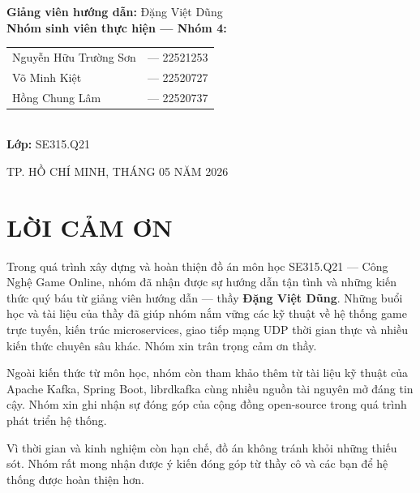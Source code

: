 \documentclass[12pt,a4paper]{report}
\begin{document}
\begin{titlepage}
\begin{flushleft}
\hspace{2cm}
\begin{minipage}{13cm}
{\fontsize{13}{15.6}\selectfont
\textbf{Giảng viên hướng dẫn:} Đặng Việt Dũng\\[0.6em]
\textbf{Nhóm sinh viên thực hiện --- Nhóm 4:}\\[0.3em]
\hspace{1cm}
\begin{tabular}{@{}ll@{}}
  Nguyễn Hữu Trường Sơn & --- 22521253 \\
  Võ Minh Kiệt          & --- 22520727 \\
  Hồng Chung Lâm        & --- 22520737 \\
\end{tabular}\\[0.6em]
\textbf{Lớp:} SE315.Q21
}
\end{minipage}
\end{flushleft}

\vfill
{\fontsize{13}{15.6}\selectfont TP. HỒ CHÍ MINH, THÁNG 05 NĂM 2026}

\end{titlepage}

\chapter*{LỜI CẢM ƠN}
\thispagestyle{fancy}

Trong quá trình xây dựng và hoàn thiện đồ án môn học SE315.Q21 --- Công Nghệ Game Online, nhóm đã nhận được sự hướng dẫn tận tình và những kiến thức quý báu từ giảng viên hướng dẫn --- thầy \textbf{Đặng Việt Dũng}. Những buổi học và tài liệu của thầy đã giúp nhóm nắm vững các kỹ thuật về hệ thống game trực tuyến, kiến trúc microservices, giao tiếp mạng UDP thời gian thực và nhiều kiến thức chuyên sâu khác. Nhóm xin trân trọng cảm ơn thầy.

Ngoài kiến thức từ môn học, nhóm còn tham khảo thêm từ tài liệu kỹ thuật của Apache Kafka, Spring Boot, librdkafka cùng nhiều nguồn tài nguyên mở đáng tin cậy. Nhóm xin ghi nhận sự đóng góp của cộng đồng open-source trong quá trình phát triển hệ thống.

Vì thời gian và kinh nghiệm còn hạn chế, đồ án không tránh khỏi những thiếu sót. Nhóm rất mong nhận được ý kiến đóng góp từ thầy cô và các bạn để hệ thống được hoàn thiện hơn.
\end{document}

